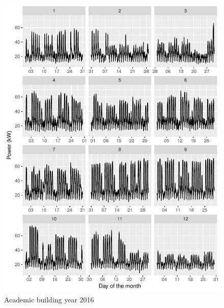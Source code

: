 \documentclass[11pt, oneside]{article}   	%
\begin{document}
\begin{figure}
\includegraphics[keepaspectratio]{acad_build_Y2016.pdf}
\caption{Academic building year 2016 }
\end{figure}
\end{document}

